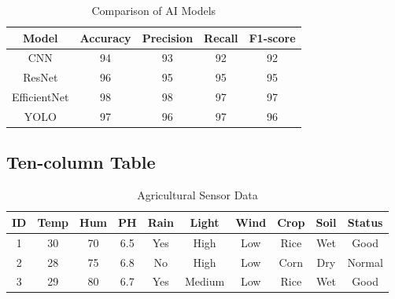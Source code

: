 \documentclass[pdflatex,sn-mathphys-num]{sn-jnl}%
\theoremstyle{thmstyleone}%
\theoremstyle{thmstyletwo}%
\theoremstyle{thmstylethree}%
\begin{document}
\begin{table}[h]

\centering

\caption{Comparison of AI Models}

\label{tab:five}

\begin{tabular}{|c|c|c|c|c|}

\hline

Model & Accuracy & Precision & Recall & F1-score\\

\hline

CNN & 94 & 93 & 92 & 92\\

\hline

ResNet & 96 & 95 & 95 & 95\\

\hline

EfficientNet & 98 & 98 & 97 & 97\\

\hline

YOLO & 97 & 96 & 97 & 96\\

\hline

\end{tabular}

\end{table}



\subsection{Ten-column Table}

\begin{table}[h]

\centering

\caption{Agricultural Sensor Data}

\label{tab:ten}

\scriptsize

\begin{tabular}{|c|c|c|c|c|c|c|c|c|c|}

\hline

ID&Temp&Hum&PH&Rain&Light&Wind&Crop&Soil&Status\\

\hline

1&30&70&6.5&Yes&High&Low&Rice&Wet&Good\\

2&28&75&6.8&No&High&Low&Corn&Dry&Normal\\

3&29&80&6.7&Yes&Medium&Low&Rice&Wet&Good\\

\hline

\end{tabular}

\end{table}
\end{document}
